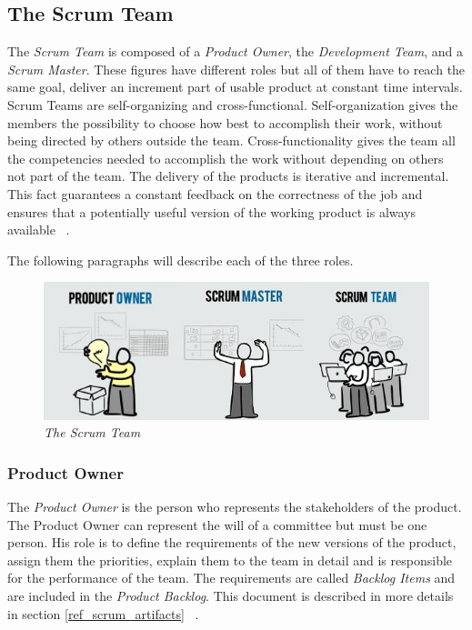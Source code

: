 		\subsection{The Scrum Team}\label{ref_scrum_team}
		The \emph{Scrum Team} is composed of a \emph{Product Owner}, the \emph{Development Team}, and a \emph{Scrum Master}.
		These figures have different roles but all of them have to reach the same goal, deliver an increment part of usable product at constant time intervals. %
		Scrum Teams are self-organizing and cross-functional. Self-organization gives the members the possibility to choose how best to accomplish their work, without being directed by others outside the team. Cross-functionality gives the team all the competencies needed to accomplish the work without depending on others not part of the team. The delivery of the products is iterative and incremental. This fact guarantees a constant feedback on the correctness of the job and ensures that a potentially useful version of the working product is always available ~\cite{scrumEnglishGuide}.

			The following paragraphs will describe each of the three roles.

			\begin{figure}[h]
			  \begin{center} 
			    \includegraphics[scale=0.75]{images/ch_04/scrum_team_final.jpg}
			  \end{center} 
			  \caption{\textit{The Scrum Team}}  
			  \label{fig:ScrumTeam}
		  	\end{figure}
			


			\subsubsection{Product Owner}\label{ref_prod_owner}
			The \emph{Product Owner} is the person who represents the stakeholders of the product. The Product Owner can represent the will of a committee but must be one person. His role is to define the requirements of the new versions of the product, assign them the priorities, explain them to the team in detail and is responsible for the performance of the team. The requirements are called \emph{Backlog Items} and are included in the \emph{Product Backlog}. This document is described in more details in section \ref{ref_scrum_artifacts} ~\cite{scrumEnglishGuide}.

